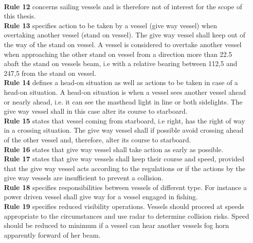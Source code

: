 \\
\textbf{Rule 12} concerns sailing vessels and is therefore not of interest for the scope of this thesis.
\\
\textbf{Rule 13} specifies action to be taken by a vessel (give way vessel) when overtaking another vessel (stand on vessel). The give way vessel shall keep out of the way of the stand on vessel. A vessel is considered to overtake another vessel when approaching the other stand on vessel from a direction more than 22.5 \textdegree abaft the stand on vessels beam, i.e with a relative bearing between 112,5 \textdegree and 247,5 \textdegree from the stand on vessel.
\\
\textbf{Rule 14} defines a head-on situation as well as actions to be taken in case of a head-on situation. A head-on situation is when a vessel sees another vessel ahead or nearly ahead, i.e. it can see the masthead light in line or both sidelights. The give way vessel shall in this case alter its course to starboard.
\\
\textbf{Rule 15} states that vessel coming from starboard, i.e right, has the right of way in a crossing situation. The give way vessel shall if possible avoid crossing ahead of the other vessel and, therefore, alter its course to starboard.
\\
\textbf{Rule 16} states that give way vessel shall take action as early as possible.
\\
\textbf{Rule 17} states that give way vessels shall keep their course and speed, provided that the give way vessel acts according to the regulations or if the actions by the give way vessels are insufficient to prevent a collision.
\\
\textbf{Rule 18} specifies responsibilities between vessels of different type. For instance a power driven vessel shall give way for a vessel engaged in fishing.
\\
\textbf{Rule 19} specifies reduced visibility operations. Vessels should proceed at speeds appropriate to the circumstances and use radar to determine collision risks. Speed should be reduced to minimum if a vessel can hear another vessels fog horn apparently forward of her beam.

